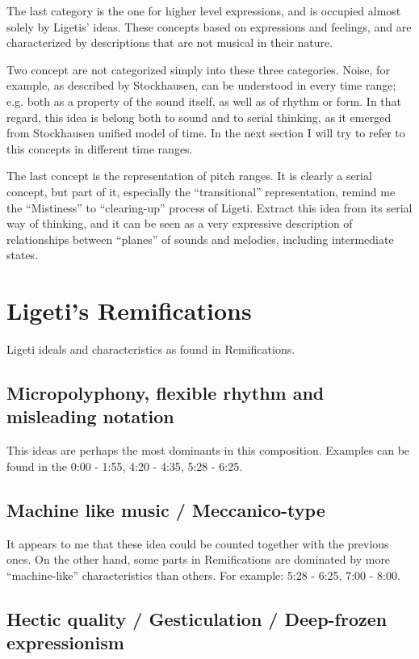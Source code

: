 \documentclass[a4paper,11pt]{article}
\begin{document}
The last category is the one for higher level expressions, and is occupied almost solely by Ligetis' ideas.
These concepts based on expressions and feelings, and are characterized by descriptions that are not musical in their nature.

Two concept are not categorized simply into these three categories.
Noise, for example, as described by Stockhausen, can be understood in every time range;
e.g. both as a property of the sound itself, as well as of rhythm or form.
In that regard, this idea is belong both to sound and to serial thinking, as it emerged from Stockhausen unified model of time.
In the next section I will try to refer to this concepts in different time ranges.

The last concept is the representation of pitch ranges.
It is clearly a serial concept, but part of it, especially the ``transitional'' representation, remind me the ``Mistiness'' to ``clearing-up'' process of Ligeti.
Extract this idea from its serial way of thinking, and it can be seen as a very expressive description of relationships between ``planes'' of sounds and melodies, including intermediate states.

\section{Ligeti's Remifications}
\label{sub:ramifications}

Ligeti ideals and characteristics as found in Remifications.

\subsection*{Micropolyphony, flexible rhythm and misleading notation}

This ideas are perhaps the most dominants in this composition.
Examples can be found in the 0:00 - 1:55, 4:20 - 4:35, 5:28 - 6:25.

\subsection*{Machine like music / Meccanico-type}

It appears to me that these idea could be counted together with the previous ones.
On the other hand, some parts in Remifications are dominated by more ``machine-like'' characteristics than others.
For example: 5:28 - 6:25, 7:00 - 8:00.

\subsection*{Hectic quality / Gesticulation / Deep-frozen expressionism}
\end{document}
